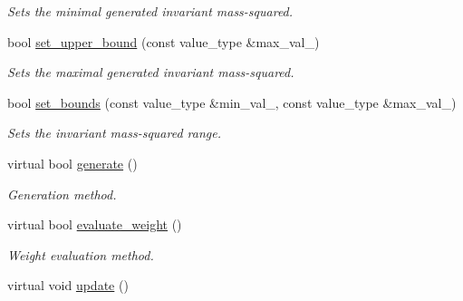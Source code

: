 \begin{DoxyCompactItemize}
\begin{DoxyCompactList}\small\item\em Sets the minimal generated invariant mass-\/squared. \end{DoxyCompactList}\item 
\hypertarget{a00577_a163f2b4e36223191a84fdac3f5b31d6f}{}bool \hyperlink{a00577_a163f2b4e36223191a84fdac3f5b31d6f}{set\+\_\+upper\+\_\+bound} (const value\+\_\+type \&max\+\_\+val\+\_\+)\label{a00577_a163f2b4e36223191a84fdac3f5b31d6f}

\begin{DoxyCompactList}\small\item\em Sets the maximal generated invariant mass-\/squared. \end{DoxyCompactList}\item 
\hypertarget{a00577_aa955515247464a5d8ea0fc326bc99afe}{}bool \hyperlink{a00577_aa955515247464a5d8ea0fc326bc99afe}{set\+\_\+bounds} (const value\+\_\+type \&min\+\_\+val\+\_\+, const value\+\_\+type \&max\+\_\+val\+\_\+)\label{a00577_aa955515247464a5d8ea0fc326bc99afe}

\begin{DoxyCompactList}\small\item\em Sets the invariant mass-\/squared range. \end{DoxyCompactList}\item 
\hypertarget{a00577_ae3f628417738cf3079006729b9ce829e}{}virtual bool \hyperlink{a00577_ae3f628417738cf3079006729b9ce829e}{generate} ()\label{a00577_ae3f628417738cf3079006729b9ce829e}

\begin{DoxyCompactList}\small\item\em Generation method. \end{DoxyCompactList}\item 
\hypertarget{a00577_afa629a1f746c5975ff16bcd9066d2c58}{}virtual bool \hyperlink{a00577_afa629a1f746c5975ff16bcd9066d2c58}{evaluate\+\_\+weight} ()\label{a00577_afa629a1f746c5975ff16bcd9066d2c58}

\begin{DoxyCompactList}\small\item\em Weight evaluation method. \end{DoxyCompactList}\item 
\hypertarget{a00577_a838f7b27eb7059e49e8cd4fa68a81b6f}{}virtual void \hyperlink{a00577_a838f7b27eb7059e49e8cd4fa68a81b6f}{update} ()\label{a00577_a838f7b27eb7059e49e8cd4fa68a81b6f}


\end{DoxyCompactItemize}
